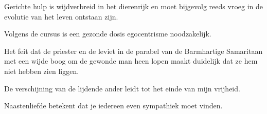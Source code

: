 \documentclass[main.tex]{subfiles}
\begin{document}
\begin{examenvraag}
\begin{stelling}
Gerichte hulp is wijdverbreid in het dierenrijk en moet bijgevolg reeds vroeg in de evolutie van het leven ontstaan zijn.
\end{stelling}

\begin{antwoord}
\end{antwoord}
\end{examenvraag}


\begin{examenvraag}
\begin{stelling}
Volgens de cursus is een gezonde dosis egocentrisme noodzakelijk.
\end{stelling}

\begin{antwoord}
\end{antwoord}
\end{examenvraag}


\begin{examenvraag}
\begin{stelling}
Het feit dat de priester en de leviet in de parabel van de Barmhartige Samaritaan met een wijde boog om de gewonde man heen lopen maakt duidelijk dat ze hem niet hebben zien liggen.
\end{stelling}

\begin{antwoord}
\end{antwoord}
\end{examenvraag}


\begin{examenvraag}
\begin{stelling}
De verschijning van de lijdende ander leidt tot het einde van mijn vrijheid.
\end{stelling}

\begin{antwoord}
\end{antwoord}
\end{examenvraag}


\begin{examenvraag}
\begin{stelling}
Naastenliefde betekent dat je iedereen even sympathiek moet vinden.
\end{stelling}

\begin{antwoord}
\end{antwoord}
\end{examenvraag}
\end{document}
